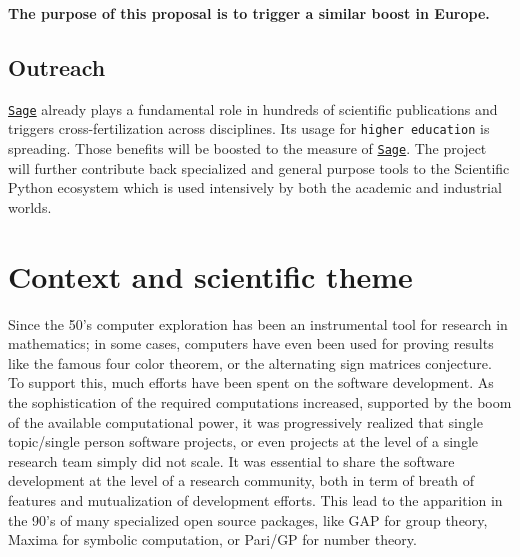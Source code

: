 \documentclass[a4,12pt]{amsart}
\newcommand{\sage}{\href{http://www.sagemath.org/}{\texttt{Sage}}\xspace}
\newcommand{\TODO}[2][To do: ]{{\textcolor{red}{\textbf{#1#2}}}}
\begin{document}
\medskip
\textbf{The purpose of this proposal is to trigger a similar boost in
  Europe.}

\subsection{Outreach}%

\sage already plays a fundamental role in hundreds of scientific
publications and triggers cross-fertilization across disciplines. Its
usage for \texttt{higher education} is spreading. Those benefits will
be boosted to the measure of \sage.  The project will further
contribute back specialized and general purpose tools to the
Scientific Python ecosystem which is used intensively by both the
academic and industrial worlds.


\clearpage

\section{Context and scientific theme}


Since the 50's computer exploration has been an instrumental tool for
research in mathematics; in some cases, computers have even been used for
proving results like the famous four color theorem, or the
alternating sign matrices conjecture.
To support this, much efforts have been spent on the software
development. As the sophistication of the required computations
increased, supported by the boom of the available computational power,
it was progressively realized that single topic/single person software
projects, or even projects at the level of a single research team
simply did not scale. It was essential to share the software
development at the level of a research community, both in term of
breath of features and mutualization of development efforts. This lead
to the apparition in the 90's of many specialized open source
packages, like GAP for group theory, Maxima for symbolic computation, or
Pari/GP for number theory.
\end{document}
